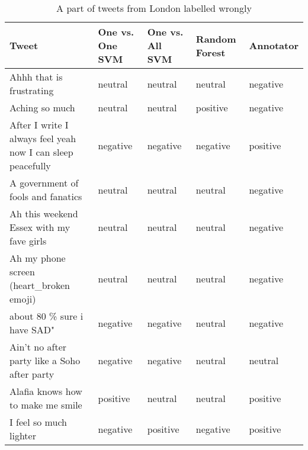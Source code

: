 \begin{table}[ht]
	\caption{A part of tweets from London labelled wrongly}
	\begin{tabular}{|p{5cm}|p{1.8cm}|p{1.8cm}|p{1.8cm}|p{1.8cm}|} \hline
	Tweet & One vs. One SVM &One vs. All SVM &Random Forest & Annotator\\ \hline
	Ahhh that is frustrating & neutral & neutral & neutral & negative\\ \hline
	Aching so much & neutral& neutral& positive & negative\\ \hline
	After I write I always feel yeah now I can sleep peacefully &negative&negative&negative&positive \\ \hline
	A government of fools and fanatics & neutral& neutral& neutral& negative \\ \hline
	Ah this weekend Essex with my fave girls & neutral& neutral& neutral& negative \\ \hline

	Ah my phone screen (heart\_broken emoji) & neutral & neutral& neutral& negative \\ \hline
	about 80 \% sure i have SAD" & negative & negative & neutral & negative\\ \hline
	Ain't no after party like a Soho after party & negative & negative & neutral & neutral \\ \hline
	Alafia knows how to make me smile & positive & neutral & neutral & positive \\ \hline
	I feel so much lighter & negative & positive & negative & positive \\ \hline

	\end{tabular}
	\label{tab:wrong_tweets_en}
\end{table}
\clearpage

